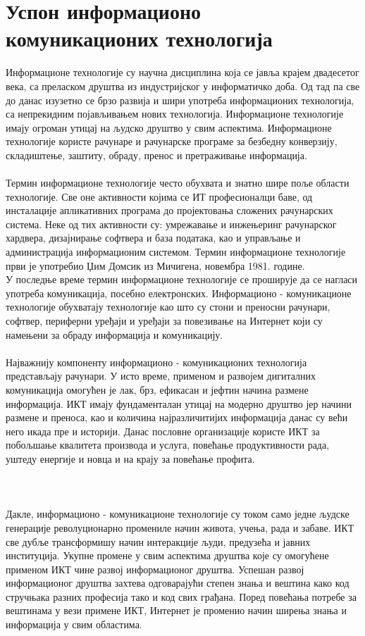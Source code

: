 \documentclass{article}
\begin{document}
\section{Успон информационо комуникационих технологија}
Информационе технологије су научна дисциплина која се јавља крајем двадесетог века, са преласком друштва из индустријског у информатичко доба. Од тад па све до данас изузетно се брзо развија и шири употреба информационих технологија, са непрекидним појављивањем нових технологија. Информационе технологије имају огроман утицај на људско друштво у свим аспектима. Информационе технологије користе рачунаре и рачунарске програме за безбедну конверзију, складиштење, заштиту, обраду, пренос и претраживање информација.
\\\\
Термин информационе технологије често обухвата и знатно шире поље области технологије. Све оне активности којима се ИТ професионалци баве, од инсталације апликативних програма до пројектовања сложених рачунарских система. Неке од тих активности су: умрежавање и инжењеринг рачунарског хардвера, дизајнирање софтвера и база података, као и управљање и администрација информационим системом. Термин информационе технологије први је употребио Џим Домсик из Мичигена, новембра 1981. године. \\
У последње време термин информационе технологије се проширује да се нагласи употреба комуникација, посебно електронских. Информационо - комуникационе технологије обухватају технологије као што су стони и преносни рачунари, софтвер, периферни уређаји и уређаји за повезивање на Интернет који су намењени за обраду информација и комуникацију.\\\\
Најважнију компоненту информационо - комуникационих технологија представљају рачунари. У исто време, применом и развојем дигиталних комуникација омогућен је лак, брз, ефикасан и јефтин начина размене информација. ИКТ имају фундаменталан утицај на модерно друштво јер начини размене и преноса, као и количина најразличитијих информација данас су већи него икада пре и историји. Данас пословне организације користе ИКТ за побољшање квалитета производа и услуга, повећање продуктивности рада, уштеду енергије и новца и на крају за повећање профита. \\\\\\\\
Дакле, информационо - комуникационе технологије су током само једне људске генерације револуционарно промениле начин живота, учења, рада и забаве. ИКТ све дубље трансформишу начин интеракције људи, предузећа и јавних институција. Укупне промене у свим аспектима друштва које су омогућене применом ИКТ чине развој информационог друштва. Успешан развој информационог друштва захтева одговарајући степен знања и вештина како код стручњака разних професија тако и код свих грађана. Поред повећања потребе за вештинама у вези примене ИКТ, Интернет је променио начин ширења знања и информација у свим областима.
\end{document}
